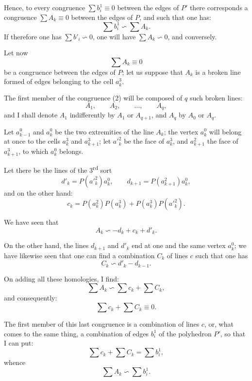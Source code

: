 \documentclass{article}
\begin{document}
Hence, to every congruence $\displaystyle\sum b^{1}_{i} \equiv 0$ between the edges of $P'$ there corresponds a congruence $\displaystyle\sum A_{k} \equiv 0$ between the edges of $P$, and such that one has:
\[ \sum b^{1}_{i} \backsim \sum A_{k}. \]
If therefore one has $\displaystyle\sum b'_{i} \backsim 0$, one will have $\displaystyle\sum A_{k} \backsim 0$, and conversely.

Let now
\[ \sum A_{k} \equiv 0 \tag{2} \]
be a congruence between the edges of $P$; let us suppose that $A_{k}$ is a broken line formed of edges belonging to the cell $a^{3}_{k}$.

The first member of the congruence (2) will be composed of $q$
such broken lines:
\[ A_{1}, \qquad A_{2}, \qquad \ldots, \qquad A_{q}, \]
and I shall denote $A_{1}$ indifferently by $A_{1}$ or $A_{q+1}$, and $A_{q}$ by $A_{0}$ or $A_{q}$.

Let $a^{0}_{k-1}$ and $a^{0}_{k}$ be the two extremities of the line $A_{k}$; the vertex $a^{0}_{k}$ will belong at once to the cells $a^{3}_{k}$ and $a^{3}_{k+1}$; let $a'^{2}_{k}$ be the face of $a^{3}_{k}$, and $a^{2}_{k+1}$ the face of $a^{3}_{k+1}$, to which $a^{0}_{k}$ belongs.

Let there be the lines of the 3\textsuperscript{rd} sort
\[ d'_{k} = P(a'^{2}_{k}) a^{0}_{k}, \qquad d_{k+1} = P(a^{2}_{k+1}) a^{0}_{k}, \]
and on the other hand:
\[ c_{k} = P(a^{2}_{k}) P(a^{3}_{k}) + P(a^{3}_{k}) P(a'^{2}_{k}). \]

We have seen that
\[ A_{k} \backsim - d_{k} + c_{k} + d'_{k}. \]

On the other hand, the lines $d_{k+1}$ and $d'_{k}$ end at one and the same vertex $a^{0}_{k}$; we have likewise seen that one can find a combination $C_{k}$ of lines $c$ such that one has
\[ C_{k} \backsim d'_{k} - d_{k-1}. \] 

On adding all these homologies, I find:
\[ \sum A_{k} \backsim \sum c_{k} + \sum C_{k}, \]
and consequently:
\[ \sum c_{k} + \sum C_{k} \equiv 0. \]

The first member of this last congruence is a combination of lines $c$, or, what comes to the same thing, a combination of edges $b^{1}_{i}$ of the polyhedron $P'$, so that I can put:
\[ \sum c_{k} + \sum C_{k} = \sum b^{1}_{i}, \]
whence
\[ \sum A_{k} \backsim \sum b^{1}_{i}. \]
\end{document}

